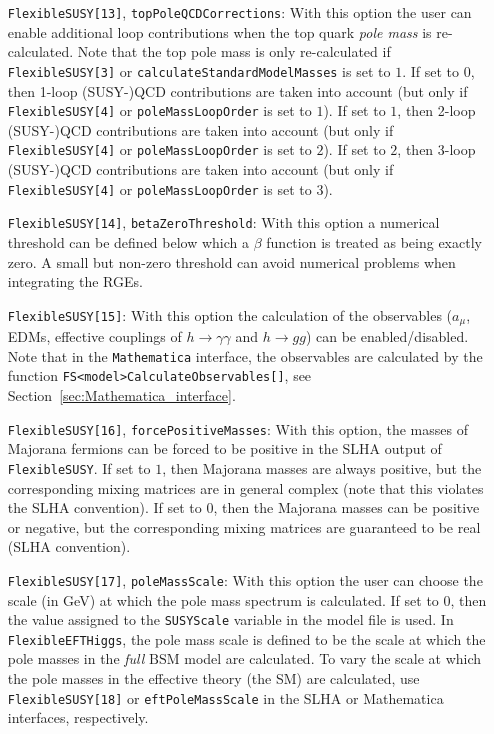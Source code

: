 \documentclass[final,3p,11pt,pdflatex]{elsarticle}
\makeatletter
\newcommand{\fs}{\texttt{FlexibleSUSY}\@\xspace}
\newcommand{\feft}{\texttt{Flex\-ib\-le\-EFT\-Higgs}\@\xspace}
\newcommand{\mathematica}{\texttt{Ma\-the\-ma\-ti\-ca}\xspace}
\newcommand{\code}[1]{\lstinline|#1|}  %
\newcommand{\BSM}{\ensuremath{\text{BSM}}\xspace}
\newcommand{\amu}{\ensuremath{a_\mu}\xspace}
\newcommand{\secref}[1]{Section~\ref{#1}}
\makeatother
\begin{document}
\begin{itemize}
\item[\texttt{FlexibleSUSY[13]},] \texttt{topPoleQCDCorrections}: With
  this option the user can enable additional loop contributions when
  the top quark \emph{pole mass} is re-calculated.  Note that the top pole mass
  is only re-calculated if \texttt{FlexibleSUSY[3]} or
  \texttt{calculateStandardModelMasses} is set to $1$.  If set to
  $0$, then 1-loop (SUSY-)QCD contributions are taken into account (but
  only if \texttt{FlexibleSUSY[4]} or \texttt{poleMassLoopOrder} is
  set to $1$).  If set to $1$, then 2-loop (SUSY-)QCD contributions are
  taken into account (but only if \texttt{FlexibleSUSY[4]} or
  \texttt{poleMassLoopOrder} is set to $2$).  If set to $2$, then
  3-loop (SUSY-)QCD contributions are taken into account (but only if
  \texttt{FlexibleSUSY[4]} or \texttt{poleMassLoopOrder} is set to
  $3$).

\item[\texttt{FlexibleSUSY[14]},] \texttt{betaZeroThreshold}: With
  this option a numerical threshold can be defined below which a
  $\beta$ function is treated as being exactly zero.  A small but
  non-zero threshold can avoid numerical problems when integrating the
  RGEs.

\item[\texttt{FlexibleSUSY[15]}:] With this option the calculation of
  the observables ($\amu$, EDMs, effective couplings of
  $h\rightarrow\gamma\gamma$ and $h\rightarrow gg$) can be
  enabled/disabled.  Note that in the \mathematica interface, the
  observables are calculated by the function
  \code{FS<model>CalculateObservables[]}, see
  \secref{sec:Mathematica_interface}.

\item[\texttt{FlexibleSUSY[16]},] \texttt{forcePositiveMasses}: With
  this option, the masses of Majorana fermions can be forced to be
  positive in the SLHA output of \fs.  If set to $1$, then Majorana
  masses are always positive, but the corresponding mixing matrices
  are in general complex (note that this violates the SLHA
  convention).  If set to $0$, then the Majorana masses can be
  positive or negative, but the corresponding mixing matrices are
  guaranteed to be real (SLHA convention).

\item[\texttt{FlexibleSUSY[17]},] \texttt{poleMassScale}: With this
  option the user can choose the scale (in GeV) at which the pole mass
  spectrum is calculated.  If set to $0$, then the value assigned to
  the \code{SUSYScale} variable in the model file is used.  In \feft,
  the pole mass scale is defined to be the scale at which the pole
  masses in the \emph{full} \BSM model are calculated.  To vary the
  scale at which the pole masses in the effective theory (the
  SM) are calculated, use \texttt{FlexibleSUSY[18]} or
  \texttt{eftPoleMassScale} in the SLHA or Mathematica interfaces,
  respectively.


\end{itemize}
\end{document}
